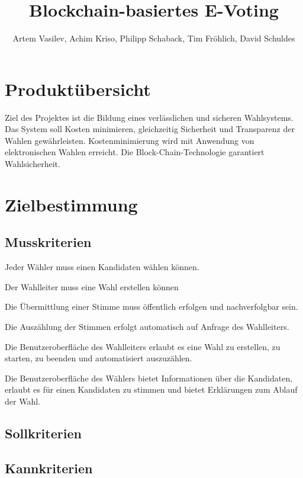 \documentclass[parskip=full,11pt,twoside]{scrartcl}
\title{Blockchain-basiertes E-Voting}
\author{Artem Vasilev, Achim Kriso, Philipp Schaback, Tim Fröhlich, David Schuldes}
\begin{document}
\maketitle

\pagebreak
\section{Produktübersicht}
Ziel des Projektes ist die Bildung eines verlässlichen und sicheren Wahlsystems. Das System soll Kosten minimieren, gleichzeitig Sicherheit und Transparenz der Wahlen gewährleisten. Kostenminimierung wird mit Anwendung von elektronischen Wahlen erreicht. Die Block-Chain-Technologie garantiert Wahlsicherheit.
\section{Zielbestimmung}

\subsection{Musskriterien}

Jeder Wähler muss einen Kandidaten wählen können.

Der Wahlleiter muss eine Wahl erstellen können

Die Übermittlung einer Stimme muss öffentlich erfolgen und nachverfolgbar sein.

Die Auszählung der Stimmen erfolgt automatisch auf Anfrage des Wahlleiters.

Die Benutzeroberfläche des Wahlleiters erlaubt es eine Wahl zu erstellen, zu starten, zu beenden und automatisiert auszuzählen. 

Die Benutzeroberfläche des Wählers bietet Informationen über die Kandidaten, erlaubt es für einen Kandidaten zu stimmen und bietet Erklärungen zum Ablauf der Wahl.

\subsection{Sollkriterien}

\subsection{Kannkriterien}
\end{document}
